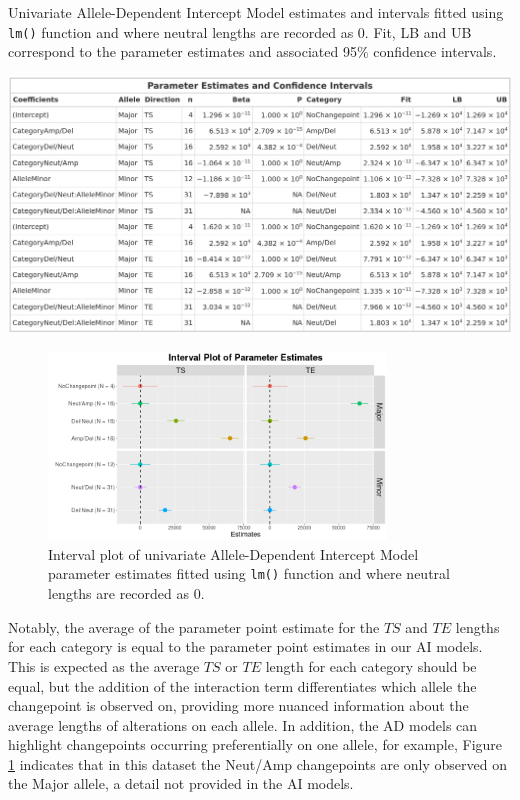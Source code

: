 \begin{table}[H]
\centering
\caption[Univariate Allele-Dependent Intercept Model parameter estimates and intervals fitted using \texttt{lm()} function.]{Univariate Allele-Dependent Intercept Model estimates and intervals fitted using \texttt{lm()} function and where neutral lengths are recorded as 0. Fit, LB and UB correspond to the parameter estimates and associated 95\% confidence intervals. }
      
\includegraphics[width = 1\textwidth]{../tables/Chapter_5/Univariate_lm_7_AD_Model_Pred.png}
\label{tab:lm_uni_AD_modpred}
\end{table}

\begin{figure}[H] 
\centering
\includegraphics[width = 0.8\textwidth]{../figures/Chapter_5/Univariate_lm_7_AD_Interval.png}
 
\caption[Interval plot of univariate Allele-Dependent Intercept Model parameter estimates fitted using \texttt{lm()} function.]{Interval plot of univariate Allele-Dependent Intercept Model parameter estimates fitted using \texttt{lm()} function and where neutral lengths are recorded as 0.}
\label{fig:lm_uni_AD_modpred}
\end{figure}

Notably, the average of the parameter point estimate for the $TS$ and $TE$ lengths for each category is equal to the parameter point estimates in our AI models. This is expected as the average $TS$ or $TE$ length for each category should be equal, but the addition of the interaction term differentiates which allele the changepoint is observed on, providing more nuanced information about the average lengths of alterations on each allele. In addition, the AD models can highlight changepoints occurring preferentially on one allele, for example, Figure \ref{fig:lm_uni_AD_modpred} indicates that in this dataset the Neut/Amp changepoints are only observed on the Major allele, a detail not provided in the AI models. 

